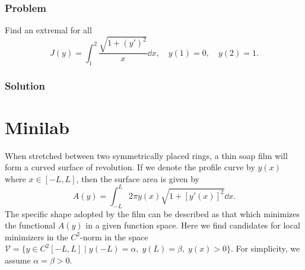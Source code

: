 \documentclass[12pt,twoside]{article}
\begin{document}
\subsubsection*{Problem}
Find an extremal for all
\begin{equation}
  \label{eq:4.3.4-problem}
  J(y) = \int_1^2\frac{\sqrt{1+{(y')}^2}}{x}\dd{x},\quad y(1)=0,\quad y(2)=1.
\end{equation}
\subsubsection*{Solution}
\todo{}

\section{Minilab}
When stretched between two symmetrically placed rings, a thin soap film will
form a curved surface of revolution. If we denote the profile curve by $y(x)$
where $x\in[-L,L]$, then the surface area is given by
\begin{equation}
  \label{eq:minilab-surface-area}
  A(y)=\int_{-L}^L 2\pi y(x) \sqrt{1 + {\left[ y'(x) \right]}^2}\dd{x}.
\end{equation}
The specific shape adopted by the film can be described as that which minimizes
the functional $A(y)$ in a given function space. Here we find candidates for
local minimizers in the $C^2$-norm in the space $\mathcal{V}=\{y\in
C^2[-L,L]\;|\;y(-L)=\alpha,\;y(L)=\beta,\;y(x)>0\}$. For simplicity, we assume
$\alpha=\beta>0$.
\end{document}
